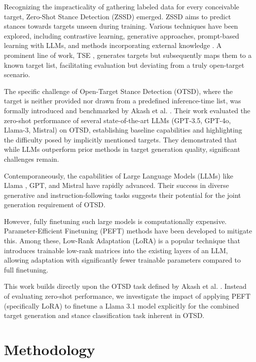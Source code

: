 \documentclass[twocolumn, 11pt,letterpaper]{article}
\begin{document}
Recognizing the impracticality of gathering labeled data for every conceivable target, Zero-Shot Stance Detection (ZSSD) emerged. ZSSD aims to predict stances towards targets unseen during training. Various techniques have been explored, including contrastive learning, generative approaches, prompt-based learning with LLMs, and methods incorporating external knowledge \cite{vast}. A prominent line of work, TSE \cite{tse,tts}, generates targets but subsequently maps them to a known target list, facilitating evaluation but deviating from a truly open-target scenario.

The specific challenge of Open-Target Stance Detection (OTSD), where the target is neither provided nor drawn from a predefined inference-time list, was formally introduced and benchmarked by Akash et al. \cite{akash2024}. Their work evaluated the zero-shot performance of several state-of-the-art LLMs (GPT-3.5, GPT-4o, Llama-3, Mistral) on OTSD, establishing baseline capabilities and highlighting the difficulty posed by implicitly mentioned targets. They demonstrated that while LLMs outperform prior methods in target generation quality, significant challenges remain.

Contemporaneously, the capabilities of Large Language Models (LLMs) like Llama \cite{llama3.1}, GPT, and Mistral have rapidly advanced. Their success in diverse generative and instruction-following tasks suggests their potential for the joint generation requirement of OTSD.

However, fully finetuning such large models is computationally expensive. Parameter-Efficient Finetuning (PEFT) methods have been developed to mitigate this. Among these, Low-Rank Adaptation (LoRA) \cite{lora} is a popular technique that introduces trainable low-rank matrices into the existing layers of an LLM, allowing adaptation with significantly fewer trainable parameters compared to full finetuning.

This work builds directly upon the OTSD task defined by Akash et al. \cite{akash2024}. Instead of evaluating zero-shot performance, we investigate the impact of applying PEFT (specifically LoRA) to finetune a Llama 3.1 model explicitly for the combined target generation and stance classification task inherent in OTSD.

\section{Methodology}
\label{sec:methodology}
\end{document}

